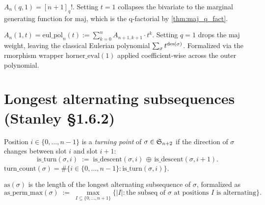 \begin{theorem}[Specialization $t = 1$ — the $q$-factorial]
  \label{thm:q_eul_pol_t1}
  \rocqok
  $A_n(q, 1) = [n+1]_q!$.
  Setting $t = 1$ collapses the bivariate to the marginal
  generating function for $\mathrm{maj}$, which is the q-factorial
  by \cref{thm:maj_q_fact}.
\end{theorem}

\begin{theorem}[Specialization $q = 1$ — the classical Eulerian polynomial]
  \label{thm:q_eul_pol_q1}
  \rocqok
  $A_n(1, t) = \mathrm{eul\_pol}_n(t) := \sum_{k=0}^{n} A_{n+1, k+1} \cdot t^k$.
  Setting $q = 1$ drops the $\mathrm{maj}$ weight, leaving the
  classical Eulerian polynomial $\sum_\sigma t^{\operatorname{des}(\sigma)}$.
  Formalized via the rmorphism wrapper $\mathrm{horner\_eval}(1)$
  applied coefficient-wise across the outer polynomial.
\end{theorem}

\section{Longest alternating subsequences (Stanley \S1.6.2)}

\begin{definition}
  \label{def:turn_count}
  \rocqok
  Position $i \in \{0, \dots, n-1\}$ is a \emph{turning point} of
  $\sigma \in \mathfrak{S}_{n+2}$ if the direction of $\sigma$ changes between
  slot $i$ and slot $i+1$:
  \[
    \mathrm{is\_turn}(\sigma, i)
    \;:=\;
    \mathrm{is\_descent}(\sigma, i) \,\oplus\, \mathrm{is\_descent}(\sigma, i+1).
  \]
  $\mathrm{turn\_count}(\sigma) = \#\{i \in \{0, \dots, n-1\} : \mathrm{is\_turn}(\sigma, i)\}$.
\end{definition}

\begin{definition}
  \label{def:as_perm_max}
  \rocqok
  $\mathrm{as}(\sigma)$ is the length of the longest alternating
  subsequence of $\sigma$, formalized as
  \[
    \mathrm{as\_perm\_max}(\sigma)
    \;:=\;
    \max_{I \subseteq \{0, \dots, n+1\}} \{|I| : \text{the subseq of }\sigma\text{ at positions }I\text{ is alternating}\}.
  \]
\end{definition}

